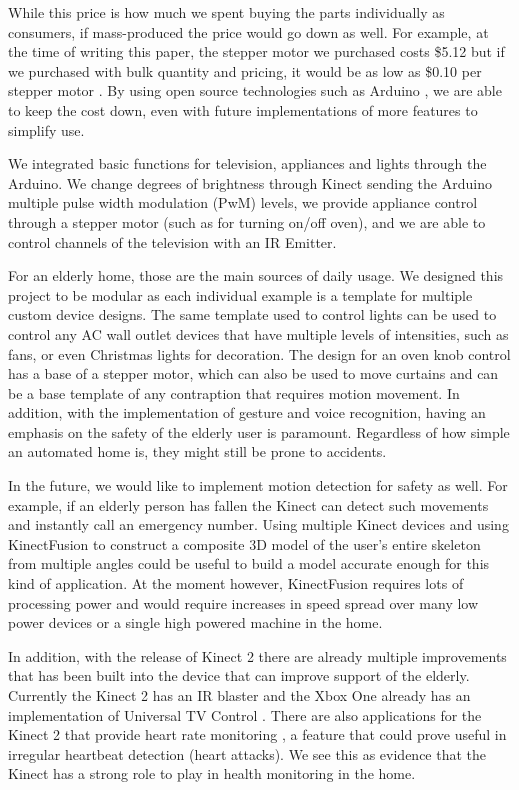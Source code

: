 \documentclass{chi-ext}
\begin{document}
While this price is how much we spent buying the parts individually as consumers, if mass-produced the price would go down as well.
For example, at the time of writing this paper, the stepper motor we purchased costs \$5.12 but if we purchased with bulk quantity and pricing, it would be as low as \$0.10 per stepper motor \cite{_stepper_motor}.
By using open source technologies such as Arduino \cite{_arduino_policy}, we are able to keep the cost down, even with future implementations of more features to simplify use.
 
We integrated basic functions for television, appliances and lights through the Arduino.
We change degrees of brightness through Kinect sending the Arduino multiple pulse width modulation (PwM) levels, we provide appliance control through a stepper motor (such as for turning on/off oven), and we are able to control channels of the television with an IR Emitter.

For an elderly home, those are the main sources of daily usage. We designed this project to be modular as each individual example is a template for multiple custom device designs.
The same template used to control lights can be used to control any AC wall outlet devices that have multiple levels of intensities, such as fans, or even Christmas lights for decoration.
The design for an oven knob control has a base of a stepper motor, which can also be used to move curtains and can be a base template of any contraption that requires motion movement.
In addition, with the implementation of gesture and voice recognition, having an emphasis on the safety of the elderly user is paramount.
Regardless of how simple an automated home is, they might still be prone to accidents. 

In the future, we would like to implement motion detection for safety as well.
For example, if an elderly person has fallen the Kinect can detect such movements and instantly call an emergency number.
Using multiple Kinect devices and using KinectFusion \cite{_kinect_fusion} to construct a composite 3D model of the user's entire skeleton from multiple angles could be useful to build a model accurate enough for this kind of application.
At the moment however, KinectFusion requires lots of processing power and would require increases in speed spread over many low power devices or a single high powered machine in the home. 

In addition, with the release of Kinect 2 there are already multiple improvements that has been built into the device that can improve support of the elderly.
Currently the Kinect 2 has an IR blaster and the Xbox One already has an implementation of Universal TV Control \cite{_control_tv}.
There are also applications for the Kinect 2 that provide heart rate monitoring \cite{_xbox_fitness}, a feature that could prove useful in irregular heartbeat detection (heart attacks).
We see this as evidence that the Kinect has a strong role to play in health monitoring in the home.
\end{document}
